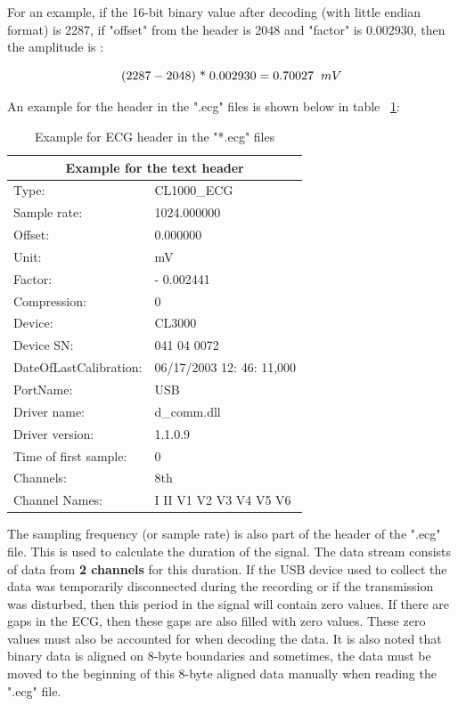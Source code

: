 For an example, if the 16-bit binary value after decoding (with little endian format) is 2287, if "offset" from the header is 2048 and "factor" is 0.002930, then the amplitude is :

\[ (2287 - 2048)\hspace{1mm} \mbox{*}\hspace{1mm} 0.002930 = 0.70027\hspace{2mm} mV \]

An example for the header in the ".ecg" files is shown below in table ~\ref{tab:ecg_header_example}:

\begin{table}[ht]
    \begin{tabular}{ll}
    \hline
        \multicolumn{2}{c}{Example for the text header} \\
    \hline
    Type:                  & CL1000\_ECG               \\
    Sample rate:           & 1024.000000               \\
    Offset:                & 0.000000                  \\
    Unit:                  & mV                        \\
    Factor:                & - 0.002441                \\
    Compression:           & 0                         \\
    Device:                & CL3000                    \\
    Device SN:             & 041 04 0072               \\
    DateOfLastCalibration: & 06/17/2003 12: 46: 11,000 \\
    PortName:              & USB                       \\
    Driver name:           & d\_comm.dll               \\
    Driver version:        & 1.1.0.9                   \\
    Time of first sample:  & 0                         \\
    Channels:              & 8th                       \\
    Channel Names:         & I II V1 V2 V3 V4 V5 V6    \\
    \hline
    \end{tabular}
    \caption{Example for ECG header in the "*.ecg" files }
    \label{tab:ecg_header_example}
\end{table}

The sampling frequency (or sample rate) is also part of the header of the ".ecg" file. This is used to calculate the duration of the signal. The data stream consists of data from \textbf{2 channels} for this duration. If the USB device used to collect the data was temporarily disconnected during the recording or if the transmission was disturbed, then this period in the signal will contain zero values. If there are gaps in the ECG, then these gaps are also filled with zero values. These zero values must also be accounted for when decoding the data. It is also noted that binary data is aligned on 8-byte boundaries and sometimes, the data must be moved to the beginning of this 8-byte aligned data manually when reading the ".ecg" file.

